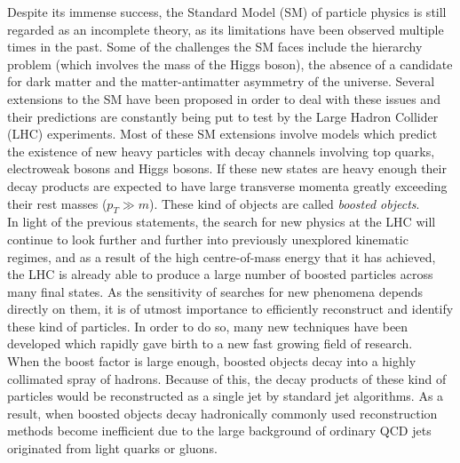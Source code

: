\documentclass[main]{subfiles} %
\begin{document}


\doublespacing

\vspace{20pt}

Despite its immense success, the Standard Model (SM) of particle physics is still regarded as an incomplete theory, as its limitations have been observed multiple times in the past. Some of the challenges the SM faces include the hierarchy problem (which involves the mass of the Higgs boson), the absence of a candidate for dark matter and the matter-antimatter asymmetry of the universe. Several extensions to the SM have been proposed in order to deal with these issues and their predictions are constantly being put to test by the Large Hadron Collider (LHC) experiments. Most of these SM extensions involve models which predict the existence of new heavy particles with decay channels involving top quarks, electroweak bosons and Higgs bosons. If these new states are heavy enough their decay products are expected to have large transverse momenta greatly exceeding their rest masses ($p_T \gg m$). These kind of objects are called \textit{boosted objects}. \\ 

In light of the previous statements, the search for new physics at the LHC will continue to look further and further into previously unexplored kinematic regimes, and as a result of the high centre-of-mass energy that it has achieved, the LHC is already able to produce a large number of boosted particles across many final states. As the sensitivity of searches for new phenomena depends directly on them, it is of utmost importance to efficiently reconstruct and identify these kind of particles. In order to do so, many new techniques have been developed which rapidly gave birth to a new fast growing field of research. \\

When the boost factor is large enough, boosted objects decay into a highly collimated spray of hadrons. Because of this, the decay products of these kind of particles would be reconstructed as a single jet by standard jet algorithms. As a result, when boosted objects decay hadronically commonly used reconstruction methods become inefficient due to the large background of ordinary QCD jets originated from light quarks or gluons. \\ 
\end{document}
